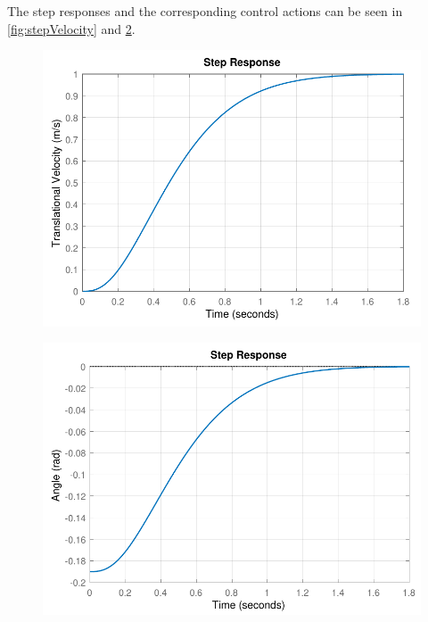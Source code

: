 The step responses and the corresponding control actions can be seen in \autoref{fig:stepVelocity} and \ref{fig:stepVelocityControlAction}.
%
\begin{minipage}{\linewidth}
    \begin{minipage}{0.5\linewidth}
        \begin{figure}[H]
            \includegraphics[scale=.55]{figures/stepVelocity}
            \centering
            \label{fig:stepVelocity}
        \end{figure}
    \end{minipage}
    \hspace{0.03\linewidth}
    \begin{minipage}{0.5\linewidth}
        \begin{figure}[H]
            \includegraphics[scale=.55]{figures/stepVelocityControlAction}
            \centering
            \label{fig:stepVelocityControlAction}
        \end{figure}
    \end{minipage}
\end{minipage}
